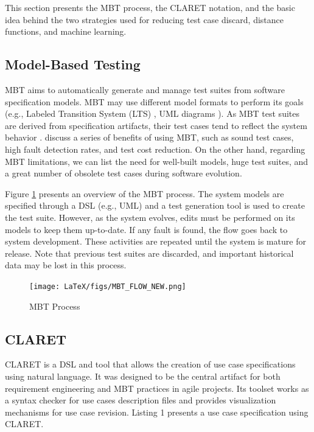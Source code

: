 This section presents the MBT process, the CLARET notation, and the basic idea behind the two strategies used for reducing test case discard, distance functions, and machine learning.

\subsection{Model-Based Testing}
MBT aims to automatically generate and manage test suites from software specification models. MBT may use different model formats to perform its goals (e.g., Labeled Transition System (LTS) \citep{tretmans2008model}, UML diagrams \citep{bouquet2007subset}). As MBT test suites are derived from specification artifacts, their test cases tend to reflect the system behavior \citep{STVR:STVR456}. \citet{Utting:2006:PMT:1200168} discuss a series of benefits of using MBT, such as sound test cases, high fault detection rates, and test cost reduction. On the other hand, regarding MBT limitations, we can list the need for well-built models, huge test suites, and a great number of obsolete test cases during software evolution. 

Figure \ref{fig: mbt_flow} presents an overview of the MBT process. The system models are specified through a DSL (e.g., UML) and a test generation tool is used to create the test suite. However, as the system evolves, edits must be performed on its models to keep them up-to-date.  If any fault is found, the flow goes back to system development. These activities are repeated until the system is mature for release. Note that previous test suites are discarded, and important historical data may be lost in this process.


\begin{figure}[h]
\texttt{[image: LaTeX/figs/MBT\_FLOW\_NEW.png]}
\caption{MBT Process}
\label{fig: mbt_flow}
\end{figure}


\subsection{CLARET}
CLARET \citep{dalton2017claret,dalton2018mbtagile} is a DSL and tool that allows the creation of use case specifications using natural language. It was designed to be the central artifact for both requirement engineering and MBT practices in agile projects. Its toolset works as a syntax checker for use cases description files and provides visualization mechanisms for use case revision. Listing 1 presents a use case specification using CLARET.  

